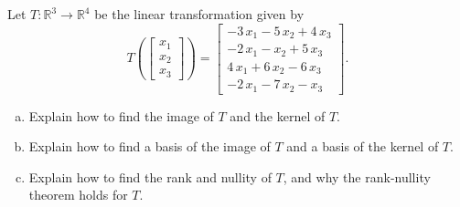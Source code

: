 
\begin{exerciseStatement}
 Let \(T:\mathbb{R}^ 3  \to \mathbb{R}^ 4 \) be the linear transformation given by \[T\left(  \left[\begin{array}{c}
x_{1} \\
x_{2} \\
x_{3}
\end{array}\right]  \right) =  \left[\begin{array}{c}
-3 \, x_{1} - 5 \, x_{2} + 4 \, x_{3} \\
-2 \, x_{1} - x_{2} + 5 \, x_{3} \\
4 \, x_{1} + 6 \, x_{2} - 6 \, x_{3} \\
-2 \, x_{1} - 7 \, x_{2} - x_{3}
\end{array}\right] .\]
\begin{enumerate}[(a)]
\item Explain how to find the image of \(T\) and the kernel of \(T\).
\item Explain how to find a basis of the image of \(T\) and a basis of the kernel of \(T\).
\item Explain how to find the rank and nullity of \(T\), and why the rank-nullity theorem holds for \(T\).
\end{enumerate}
    
\end{exerciseStatement}
    
